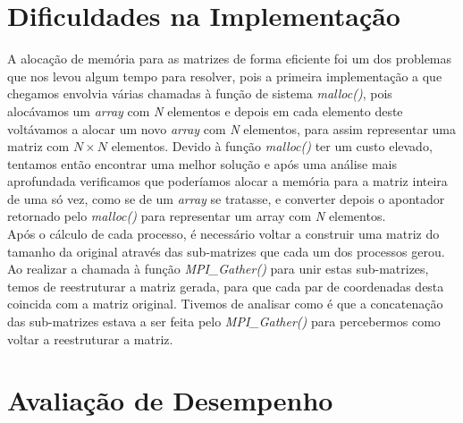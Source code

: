 \documentclass{llncs}
\begin{document}
\section{Dificuldades na Implementação}

A alocação de memória para as matrizes de forma eficiente foi um dos problemas que nos levou algum tempo para resolver, pois a primeira implementação a que chegamos envolvia várias chamadas à função de sistema \textit{malloc()}, pois alocávamos um \textit{array} com \textit{N} elementos e depois em cada elemento deste voltávamos a alocar um novo \textit{array} com \textit{N} elementos, para assim representar uma matriz com $N \times N$ elementos. Devido à função \textit{malloc()} ter um custo elevado, tentamos então encontrar uma melhor solução e após uma análise mais aprofundada verificamos que poderíamos alocar a memória para a matriz inteira de uma só vez, como se de um \textit{array} se tratasse, e converter depois o apontador retornado pelo \textit{malloc()} para representar um array com \textit{N} elementos. \\

Após o cálculo de cada processo, é necessário voltar a construir uma matriz do tamanho da original através das sub-matrizes que cada um dos processos gerou. Ao realizar a chamada à função \textit{MPI\_Gather()} para unir estas sub-matrizes, temos de reestruturar a matriz gerada, para que cada par de coordenadas desta coincida com a matriz original. Tivemos de analisar como é que a concatenação das sub-matrizes estava a ser feita pelo \textit{MPI\_Gather()} para percebermos como voltar a reestruturar a matriz.

\section{Avaliação de Desempenho}
\end{document}
